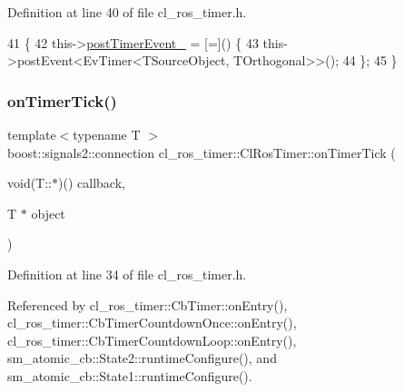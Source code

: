 Definition at line 40 of file cl\+\_\+ros\+\_\+timer.\+h.


\begin{DoxyCode}
41     \{
42         this->\hyperlink{classcl__ros__timer_1_1ClRosTimer_af502ca54355f50d19d4aa6ca5f4e0c23}{postTimerEvent\_} = [=]() \{
43             this->postEvent<EvTimer<TSourceObject, TOrthogonal>>();
44         \};
45     \}
\end{DoxyCode}
\mbox{\label{classcl__ros__timer_1_1ClRosTimer_a7edcc057bfb5a25fe0892755137dd8da}} 
\subsubsection{\texorpdfstring{on\+Timer\+Tick()}{onTimerTick()}}
{\footnotesize\ttfamily template$<$typename T $>$ \\
boost\+::signals2\+::connection cl\+\_\+ros\+\_\+timer\+::\+Cl\+Ros\+Timer\+::on\+Timer\+Tick (\begin{DoxyParamCaption}\item[{void(T\+::$\ast$)()}]{callback,  }\item[{T $\ast$}]{object }\end{DoxyParamCaption})\hspace{0.3cm}{\ttfamily [inline]}}



Definition at line 34 of file cl\+\_\+ros\+\_\+timer.\+h.



Referenced by cl\+\_\+ros\+\_\+timer\+::\+Cb\+Timer\+::on\+Entry(), cl\+\_\+ros\+\_\+timer\+::\+Cb\+Timer\+Countdown\+Once\+::on\+Entry(), cl\+\_\+ros\+\_\+timer\+::\+Cb\+Timer\+Countdown\+Loop\+::on\+Entry(), sm\+\_\+atomic\+\_\+cb\+::\+State2\+::runtime\+Configure(), and sm\+\_\+atomic\+\_\+cb\+::\+State1\+::runtime\+Configure().


